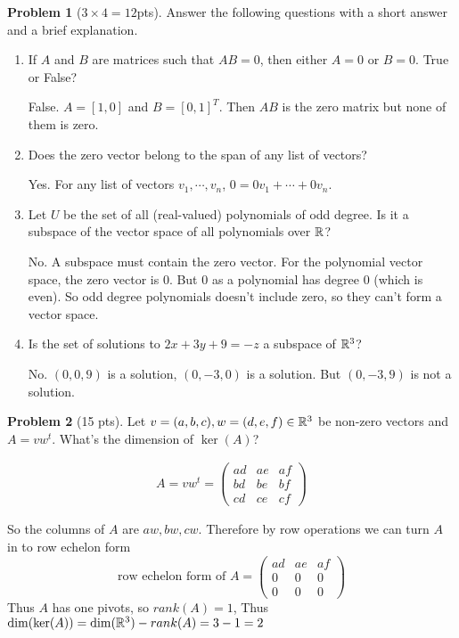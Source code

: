 \documentclass[12pt]{amsart}
\theoremstyle{definition}
\newtheorem{prob}{Problem}
\newcommand{\blu}[1]{{\color{blue}#1}}
\begin{document}
\begin{prob}[$3\times 4 = 12$pts]Answer the following questions with a short answer and a brief explanation.
	\begin{enumerate}
		\item If $A$ and $B$ are matrices such that $AB=0$, then either $A=0$ or $B=0$. True or False?
		
		\blu{False. $ A=[1,0]$ and $B=[0,1]^T$. Then $AB$ is the zero matrix but none of them is zero.}
		
		\item Does the zero vector belong to the span of any list of vectors? 
		
		\blu{Yes. For any list of vectors $v_1,\cdots,v_n$, $0=0v_1+\cdots+0v_n $.}
		
		\item Let $U$ be the set of all (real-valued) polynomials of odd degree. Is it a subspace of the vector space of all polynomials over $\mathbb{R}$?
		
		\blu{No. A subspace must contain the zero vector. For the polynomial vector space, the zero vector is $0$. But $0$ as a polynomial has degree $0$ (which is even). So odd degree polynomials doesn't include zero, so they can't form a vector space.}
		\item Is the set of solutions to $2x+3y+9=-z$ a subspace of $\mathbb{R}^3$?	
		
		\blu{No. $(0,0,9)$ is a solution, $(0,-3,0)$ is a solution. But $(0,-3,9)$ is not a solution.}
		
		\end{enumerate}
\end{prob}



\begin{prob}[15 pts]
	Let $v=(a,b,c),w=(d,e,f)\in\mathbb{R}^3$ be non-zero vectors and $A=vw^{t}$. What's the dimension of $\ker(A)$?
\end{prob}
\blu{
\begin{align*}
	A=vw^t=\begin{pmatrix}
		ad&ae&af\\bd&be&bf\\cd&ce&cf
	\end{pmatrix}
\end{align*}

So the columns of $A$ are $aw,bw,cw$. Therefore by row operations we can turn $A$ in to row echelon form
\[\text{row echelon form of } A=\begin{pmatrix}
		ad&ae&af\\0&0&0\\0&0&0	\end{pmatrix}\]
Thus $A$ has one pivots, so $rank(A)=1$, Thus $\dim(\ker(A))=\dim(\mathbb{R}^3)-rank(A)=3-1=2$
}
\end{document}
